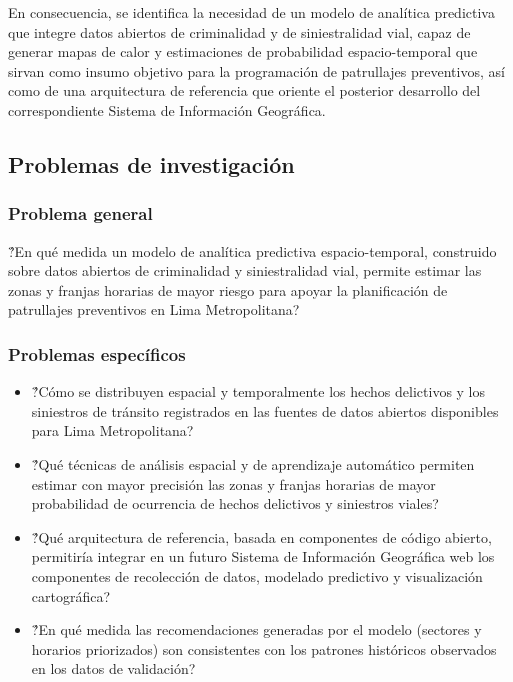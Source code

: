 \documentclass[12pt,letterpaper]{report}
\begin{document}
En consecuencia, se identifica la necesidad de un modelo de analítica predictiva que integre datos abiertos de criminalidad y de siniestralidad vial, capaz de generar mapas de calor y estimaciones de probabilidad espacio-temporal que sirvan como insumo objetivo para la programaci\'on de patrullajes preventivos, as\'i como de una arquitectura de referencia que oriente el posterior desarrollo del correspondiente Sistema de Informaci\'on Geogr\'afica.

\subsection{Problemas de investigaci\'on}

\subsubsection{Problema general}
\'?En qu\'e medida un modelo de analítica predictiva espacio-temporal, construido sobre datos abiertos de criminalidad y siniestralidad vial, permite estimar las zonas y franjas horarias de mayor riesgo para apoyar la planificaci\'on de patrullajes preventivos en Lima Metropolitana?

\subsubsection{Problemas espec\'ificos}
\begin{itemize}
    \item[PE1:] \'?C\'omo se distribuyen espacial y temporalmente los hechos delictivos y los siniestros de tr\'ansito registrados en las fuentes de datos abiertos disponibles para Lima Metropolitana?
    \item[PE2:] \'?Qu\'e t\'ecnicas de an\'alisis espacial y de aprendizaje autom\'atico permiten estimar con mayor precisi\'on las zonas y franjas horarias de mayor probabilidad de ocurrencia de hechos delictivos y siniestros viales?
    \item[PE3:] \'?Qu\'e arquitectura de referencia, basada en componentes de c\'odigo abierto, permitir\'ia integrar en un futuro Sistema de Informaci\'on Geogr\'afica web los componentes de recolecci\'on de datos, modelado predictivo y visualizaci\'on cartogr\'afica?
    \item[PE4:] \'?En qu\'e medida las recomendaciones generadas por el modelo (sectores y horarios priorizados) son consistentes con los patrones hist\'oricos observados en los datos de validaci\'on?
\end{itemize}
\end{document}
